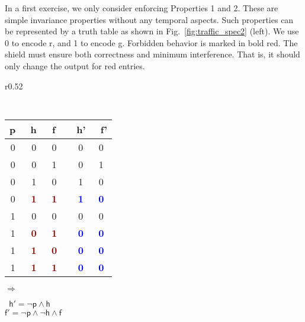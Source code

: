 \documentclass{llncs}
\begin{document}
In a first exercise, we only consider enforcing Properties 1 and 2.  
These are simple invariance properties without any temporal aspects.  
Such properties can be represented by a truth table as shown in 
Fig.~\ref{fig:traffic_spec2} (left). We use 0 to encode \textsf{r}, and 
1 to encode \textsf{g}.  Forbidden behavior is marked in bold red.  The 
shield must ensure both correctness and
minimum interference. That is, it should only change the output for red
entries. 
\begin{wrapfigure}[9]{r}{0.52\textwidth}
\vspace{-0.7cm}
\begin{minipage}{0.21\textwidth}
\centering
{\scriptsize \tt
\begin{tabular}{ccc|cc}\hline
    \textsf{p}~ & \textsf{h}~ & \textsf{f}~ & ~\textsf{h'} & 
~\textsf{f'} \\\hline
    0~ & 0~ &  0~ &  ~0 &  0\\ 
    0~ & 0~ &  1~ &  ~0 &  1\\
    0~ & 1~ &  0~ &  ~1 &  0\\
    0~ & \textcolor{darkred}{\bf 1}~ &\textcolor{darkred}{\bf 1}~ & 
~\textcolor{blue}{\bf 1} & \textcolor{blue}{\bf 0}\\
\hline
    1~ & 0~ &  0~ &  ~0 &  0\\ 
    1~ & \textcolor{darkred}{\bf 0}~ &\textcolor{darkred}{\bf 1}~ & 
~\textcolor{blue}{\bf 0} & \textcolor{blue}{\bf 0}\\
    1~ & \textcolor{darkred}{\bf 1}~ &\textcolor{darkred}{\bf 0}~ & 
~\textcolor{blue}{\bf 0} & \textcolor{blue}{\bf 0}\\
    1~ & \textcolor{darkred}{\bf 1}~ &\textcolor{darkred}{\bf 1}~ & 
~\textcolor{blue}{\bf 0} & \textcolor{blue}{\bf 0}\\
\hline
\end{tabular}
}
\end{minipage}
$\Rightarrow$
\begin{minipage}{.27\textwidth}
\centering
{\scriptsize \tt
$\mathsf{h' = \neg p \wedge h}$\\
$\mathsf{f' = \neg p \wedge \neg h \wedge f}$\\
}
\verb' '\\
\end{minipage}
\end{wrapfigure}
\end{document}
